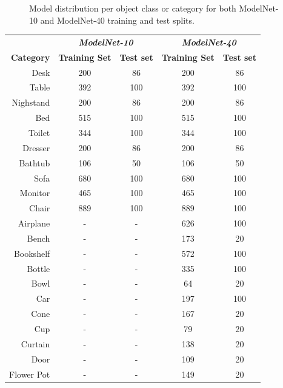 \begin{figure}[!h]
    \centering
    
    \caption{Model distribution per object class or category for both ModelNet-10 and ModelNet-40 training and test splits.}
    \label{fig:objrecog:modelnet_distribution}
\end{figure}

\begin{table}
    \centering
    \begin{tabular}{rcccc}
    &	\multicolumn{2}{c}{\textbf{\emph{ModelNet-10}}} & \multicolumn{2}{c}{\textbf{\emph{ModelNet-40}}}\\
    \textbf{Category}  & \textbf{Training Set} & \textbf{Test set} & \textbf{Training Set} & \textbf{Test set} \\
    \toprule
    Desk      & 200        & 86		& 200  & 86     \\
    Table     & 392        & 100    & 392  & 100	\\
    Nighstand & 200        & 86     & 200  & 86		\\
    Bed       & 515        & 100    & 515  & 100	\\
    Toilet    & 344        & 100    & 344  & 100	\\
    Dresser   & 200        & 86     & 200  & 86		\\
    Bathtub   & 106        & 50     & 106  & 50		\\
    Sofa      & 680        & 100    & 680  & 100	\\
    Monitor   & 465        & 100    & 465  & 100 	\\
    Chair     & 889        & 100    & 889  & 100	\\
    Airplane  & -	 & -	 & 626	& 100 \\
    Bench	  & -	 & -	 & 173	& 20 \\
    Bookshelf & -	 & -	 & 572	& 100 \\
    Bottle	  & -	 & -	 & 335	& 100 \\
    Bowl	  & -	 & -	 & 64	& 20 \\
    Car		  & -	 & -	 & 197	& 100 \\
    Cone	  & -	 & -	 & 167	& 20 \\
    Cup		  & -	 & -	 & 79	& 20 \\
    Curtain	  & -	 & -	 & 138	& 20 \\
    Door	  & -	 & -	 & 109	& 20 \\
    Flower Pot & -	 & -	 & 149	& 20 \\

\end{tabular}
\end{table}
